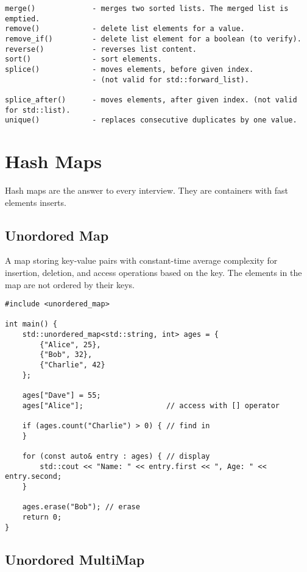 \begin{verbatim}
merge()             - merges two sorted lists. The merged list is emptied.
remove()            - delete list elements for a value.
remove_if()         - delete list element for a boolean (to verify).
reverse()           - reverses list content.
sort()              - sort elements.
splice()            - moves elements, before given index.
                    - (not valid for std::forward_list).

splice_after()      - moves elements, after given index. (not valid for std::list).
unique()            - replaces consecutive duplicates by one value.
\end{verbatim}

\section{Hash Maps}

Hash maps are the answer to every interview. They are containers with fast elements inserts.

\subsection{Unordored Map}

A map storing key-value pairs with constant-time average complexity for insertion,
deletion, and access operations based on the key.
The elements in the map are not ordered by their keys.

\begin{verbatim}
#include <unordered_map>

int main() {
    std::unordered_map<std::string, int> ages = {
        {"Alice", 25},
        {"Bob", 32},
        {"Charlie", 42}
    };

    ages["Dave"] = 55;
    ages["Alice"];                   // access with [] operator

    if (ages.count("Charlie") > 0) { // find in
    }

    for (const auto& entry : ages) { // display
        std::cout << "Name: " << entry.first << ", Age: " << entry.second;
    }

    ages.erase("Bob"); // erase
    return 0;
}
\end{verbatim}

\subsection{Unordored MultiMap}

